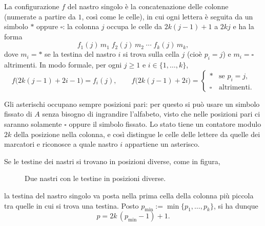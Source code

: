 La configurazione $f$ del nastro singolo è la concatenazione delle colonne (numerate a
partire da $1$, così come le celle), in cui ogni lettera è seguita da un simbolo $*$ oppure
$\square$: la colonna $j$ occupa le celle da $2k(j-1)+1$ a $2kj$ e ha la forma
\[
  f_1(j)\, m_1\; f_2(j)\, m_2\; \cdots\; f_k(j)\, m_k,
\]
dove $m_i = *$ se la testina del nastro $i$ si trova sulla cella $j$ (cioè $p_i=j$) e
$m_i = \square$ altrimenti. In modo formale, per ogni $j \geq 1$ e
$i \in \{1,\dots,k\}$,
\[
  f\big(2k(j-1)+2i-1\big) = f_i(j),
  \qquad
  f\big(2k(j-1)+2i\big) =
  \begin{cases}
    * & \text{se } p_i = j,\\
    \square & \text{altrimenti.}
  \end{cases}
\]

\begin{rema}
Gli asterischi occupano sempre posizioni pari: per questo si può usare un simbolo fissato
di $A$ senza bisogno di ingrandire l'alfabeto, visto che nelle posizioni pari ci saranno
solamente $\square$ oppure il simbolo fissato. Lo stato tiene un contatore modulo $2k$
della posizione nella colonna, e così distingue le celle delle lettere da quelle dei
marcatori e riconosce a quale nastro $i$ appartiene un asterisco.
\end{rema}

Se le testine dei nastri si trovano in posizioni diverse, come in figura,
\begin{figure}[H]
\centering
{}
\caption{Due nastri con le testine in posizioni diverse.}
\label{fig:testine-diverse}
\end{figure}
la testina del nastro singolo va posta nella prima cella della colonna più piccola tra
quelle in cui si trova una testina. Posto $p_{\min} := \min\{p_1,\dots,p_k\}$, si ha
dunque
\[
  p = 2k\,(p_{\min}-1)+1.
\]

